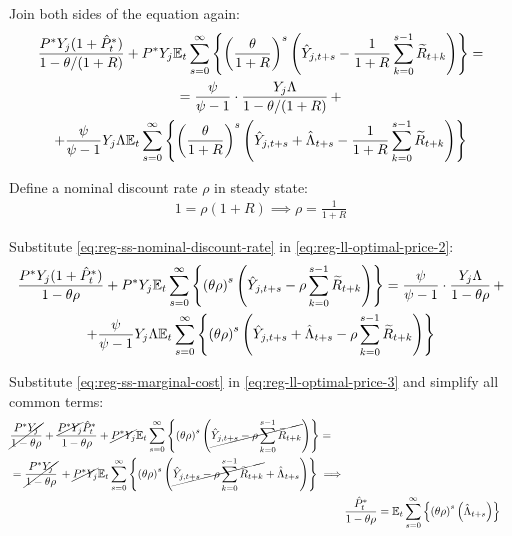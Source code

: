\documentclass[
	thesis.tex
	]{subfiles}
\begin{document}
Join both sides of the equation again:
\begin{multline}
	\frac{ P^\ast Y_{j} ( 1 + \hat{P}_t^\ast ) }{1-\theta /(1+R)} + P^\ast Y_{j} {\mathbb{E}_{t}} \sum_{s=0}^{\infty} \left\{ \left( \frac{\theta}{1 + R} \right)^s \left( \hat{Y}_{j,t+s} - \frac{1}{1 + R} \sum_{k=0}^{s-1} \widetilde{R}_{t+k} \right) \right\} = 
	\\
	= \frac{\psi}{\psi-1} \cdot \frac{Y_{j} \Lambda}{1-\theta /(1+R)} \, + 
	\\
	+ \frac{\psi}{\psi-1} Y_{j} \Lambda {\mathbb{E}_{t}} \sum_{s=0}^{\infty} \left\{ \left( \frac{\theta}{1 + R} \right)^s \left( \hat{Y}_{j,t+s} + \hat{\Lambda}_{t+s} - \frac{1}{1 + R} \sum_{k=0}^{s-1} \widetilde{R}_{t+k} \right) \right\} \label{eq:reg-ll-optimal-price-2}
\end{multline}

Define a nominal discount rate $\rho$ in steady state:
\begin{align}
	1 = \rho (1 + R) \implies \rho = \frac{1}{1 + R} \label{eq:reg-ss-nominal-discount-rate}
\end{align}

Substitute \ref{eq:reg-ss-nominal-discount-rate} in \ref{eq:reg-ll-optimal-price-2}:
\begin{multline}
	\frac{ P^\ast Y_{j} ( 1 + \hat{P}_t^\ast ) }{1- \theta \rho} + P^\ast Y_{j} {\mathbb{E}_{t}} \sum_{s=0}^{\infty} \left\{ \left( \theta \rho \right)^s \left( \hat{Y}_{j,t+s} - \rho \sum_{k=0}^{s-1} \widetilde{R}_{t+k} \right) \right\} = \frac{\psi}{\psi-1} \cdot \frac{Y_{j} \Lambda}{1- \theta \rho } \, + 
	\\ 
	+ \frac{\psi}{\psi-1} Y_{j} \Lambda {\mathbb{E}_{t}} \sum_{s=0}^{\infty} \left\{ \left( \theta \rho \right)^s \left( \hat{Y}_{j,t+s} + \hat{\Lambda}_{t+s} - \rho \sum_{k=0}^{s-1} \widetilde{R}_{t+k} \right) \right\} \label{eq:reg-ll-optimal-price-3}
\end{multline}

Substitute \ref{eq:reg-ss-marginal-cost} in \ref{eq:reg-ll-optimal-price-3} and simplify all common terms:
\begin{align}
	\begin{split}
		& \cancel{\frac{P^\ast Y_{j}}{1-\theta\rho}} + \frac{ \cancel{P^\ast Y_{j}} \hat{P}_t^\ast }{1- \theta \rho} + \cancel{P^\ast Y_{j}} {\mathbb{E}_{t}} \sum_{s=0}^{\infty} \left\{ \left( \theta \rho \right)^s \left( \cancel{\hat{Y}_{j,t+s} - \rho \sum_{k=0}^{s-1} \widetilde{R}_{t+k}} \right) \right\} = 
		\\
		& = \cancel{\frac{P^\ast Y_{j}}{1-\theta\rho}} \, + \cancel{P^\ast Y_{j}} {\mathbb{E}_{t}} \sum_{s=0}^{\infty} \left\{ \left( \theta \rho \right)^s \left( \cancel{\hat{Y}_{j,t+s} - \rho \sum_{k=0}^{s-1} \widetilde{R}_{t+k}} + \hat{\Lambda}_{t+s} \right) \right\} \implies	
	\end{split} \nonumber \\
	& \frac{ \hat{P}_t^\ast }{1- \theta \rho} = {\mathbb{E}_{t}} \sum_{s=0}^{\infty} \left\{ \left( \theta \rho \right)^s \left( \hat{\Lambda}_{t+s} \right) \right\} \label{eq:reg-ll-optimal-price-4}
\end{align}
\end{document}
